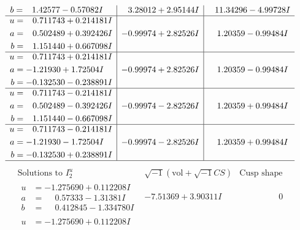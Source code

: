 \documentclass[1p]{elsarticle_modified}
\theoremstyle{definition}
\newcommand{\I}{\sqrt{-1}}
\begin{document}
$$\begin{array}{c|c|c}
\begin{aligned}
b &= \phantom{-}1.42577 - 0.57082 I\end{aligned}
 & \phantom{-}3.28012 + 2.95144 I & \phantom{-}11.34296 - 4.99728 I \\ \hline\begin{aligned}
u &= \phantom{-}0.711743 + 0.214181 I \\
a &= \phantom{-}0.502489 + 0.392426 I \\
b &= \phantom{-}1.151440 + 0.667098 I\end{aligned}
 & -0.99974 + 2.82526 I & \phantom{-}1.20359 - 0.99484 I \\ \hline\begin{aligned}
u &= \phantom{-}0.711743 + 0.214181 I \\
a &= -1.21930 + 1.72504 I \\
b &= -0.132530 - 0.238891 I\end{aligned}
 & -0.99974 + 2.82526 I & \phantom{-}1.20359 - 0.99484 I \\ \hline\begin{aligned}
u &= \phantom{-}0.711743 - 0.214181 I \\
a &= \phantom{-}0.502489 - 0.392426 I \\
b &= \phantom{-}1.151440 - 0.667098 I\end{aligned}
 & -0.99974 - 2.82526 I & \phantom{-}1.20359 + 0.99484 I \\ \hline\begin{aligned}
u &= \phantom{-}0.711743 - 0.214181 I \\
a &= -1.21930 - 1.72504 I \\
b &= -0.132530 + 0.238891 I\end{aligned}
 & -0.99974 - 2.82526 I & \phantom{-}1.20359 + 0.99484 I\\
 \hline 
 \end{array}$$\newpage$$\begin{array}{c|c|c}  
\text{Solutions to }I^u_{2}& \I (\text{vol} + \sqrt{-1}CS) & \text{Cusp shape}\\
 \hline 
\begin{aligned}
u &= -1.275690 + 0.112208 I \\
a &= \phantom{-}0.57333 - 1.31381 I \\
b &= \phantom{-}0.412845 - 1.334780 I\end{aligned}
 & -7.51369 + 3.90311 I & \phantom{-0.000000 } 0 \\ \hline\begin{aligned}
u &= -1.275690 + 0.112208 I \\

\end{aligned}
\end{array}$$
\end{document}
